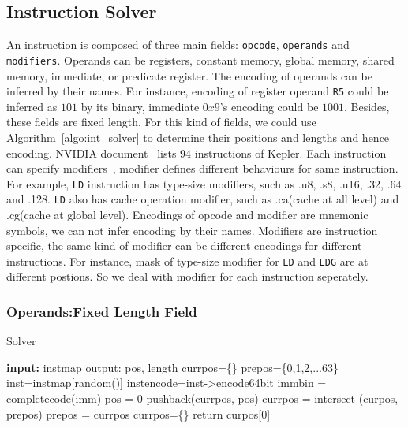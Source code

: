 \subsection{Instruction Solver}
An instruction is composed of three main fields: {\tt opcode}, {\tt operands} and {\tt modifiers}.
Operands can be registers, constant memory, global memory, shared memory, immediate, or predicate register.
The encoding of operands can be inferred by their names. For instance, encoding of register operand {\tt R5} could be
inferred as $101$ by its binary, immediate $0x9$'s encoding could be $1001$. Besides, these fields are fixed length. For this kind of
fields, we could use Algorithm~\ref{algo:int_solver} to determine their positions and lengths and hence encoding.
NVIDIA document~\cite{cubin2015util} lists $94$ instructions of Kepler.
Each instruction can specify modifiers~\cite{ptx2015isa}, modifier defines different behaviours for same instruction. For example,
{\tt LD} instruction has type-size modifiers, such as .u8, .s8, .u16, .32, .64 and .128. {\tt LD} also has cache operation
modifier, such as .ca(cache at all level) and .cg(cache at global level).
Encodings of opcode and modifier are mnemonic symbols, we can not infer encoding by their names. Modifiers are instruction
specific, the same kind of modifier can be different encodings for different instructions. For instance, mask of type-size
modifier for {\tt LD} and {\tt LDG} are at different postions. So we deal with modifier for each instruction seperately.

\subsubsection{Operands:Fixed Length Field}
\begin{algorithm}
      \caption{Solver}
      \label{algo:int_solver}
  \begin{algorithmic}[1]
	  \State \textbf{input:} instmap
      \State output: pos, length
      \State currpos=\{\}
      \State prepos=\{0,1,2,...63\}
      \State inst=instmap[random()]
      \State instencode=inst->encode64bit
      \State immbin = completecode(imm)
      \State pos = 0
      \State pushback(currpos, pos)
      \EndIf
      \EndWhile
      \State currpos = intersect (curpos, prepos)
      \State prepos = currpos
      \State currpos=\{\}
      \EndIf
      \EndWhile
      \State return curpos[0]
  \end{algorithmic}
\end{algorithm}
